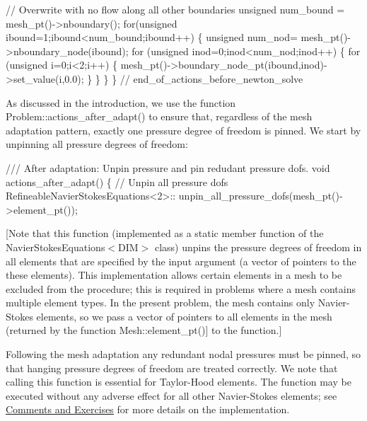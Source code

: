 \begin{DoxyCodeInclude}
  \textcolor{comment}{// Overwrite with no flow along all other boundaries}
  \textcolor{keywordtype}{unsigned} num\_bound = mesh\_pt()->nboundary();
  \textcolor{keywordflow}{for}(\textcolor{keywordtype}{unsigned} ibound=1;ibound<num\_bound;ibound++)
   \{
    \textcolor{keywordtype}{unsigned} num\_nod= mesh\_pt()->nboundary\_node(ibound);
    \textcolor{keywordflow}{for} (\textcolor{keywordtype}{unsigned} inod=0;inod<num\_nod;inod++)
     \{
      \textcolor{keywordflow}{for} (\textcolor{keywordtype}{unsigned} i=0;i<2;i++)
       \{
        mesh\_pt()->boundary\_node\_pt(ibound,inod)->set\_value(i,0.0);
       \}
     \}
   \}
  \} \textcolor{comment}{// end\_of\_actions\_before\_newton\_solve}

\end{DoxyCodeInclude}


As discussed in the introduction, we use the function {\ttfamily Problem\+::actions\+\_\+after\+\_\+adapt()} to ensure that, regardless of the mesh adaptation pattern, exactly one pressure degree of freedom is pinned. We start by unpinning all pressure degrees of freedom\+:


\begin{DoxyCodeInclude}
 \textcolor{comment}{/// After adaptation: Unpin pressure and pin redudant pressure dofs.}
 \textcolor{keywordtype}{void} actions\_after\_adapt()
  \{
   \textcolor{comment}{// Unpin all pressure dofs}
   RefineableNavierStokesEquations<2>::
    unpin\_all\_pressure\_dofs(mesh\_pt()->element\_pt());

\end{DoxyCodeInclude}


\mbox{[}Note that this function (implemented as a static member function of the {\ttfamily Navier\+Stokes\+Equations$<$\+D\+I\+M$>$} class) unpins the pressure degrees of freedom in all elements that are specified by the input argument (a vector of pointers to the these elements). This implementation allows certain elements in a mesh to be excluded from the procedure; this is required in problems where a mesh contains multiple element types. In the present problem, the mesh contains only Navier-\/\+Stokes elements, so we pass a vector of pointers to all elements in the mesh (returned by the function {\ttfamily Mesh\+::element\+\_\+pt()}\mbox{]} to the function.\mbox{]}

Following the mesh adaptation any redundant nodal pressures must be pinned, so that hanging pressure degrees of freedom are treated correctly. We note that calling this function is essential for Taylor-\/\+Hood elements. The function may be executed without any adverse effect for all other Navier-\/\+Stokes elements; see \hyperlink{index_comments}{Comments and Exercises} for more details on the implementation.


